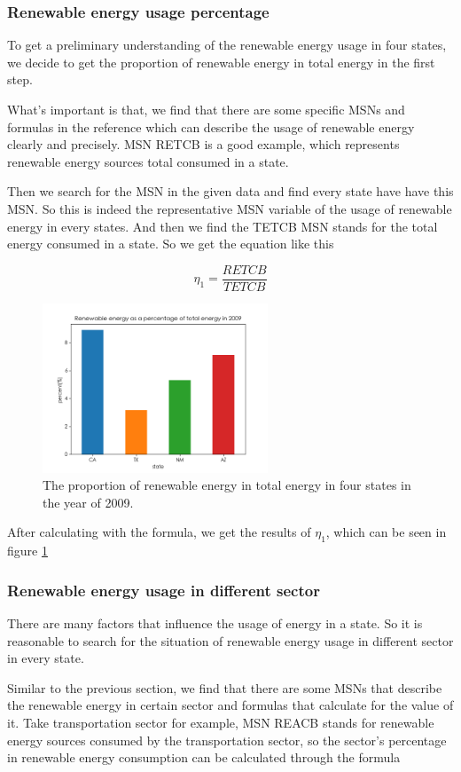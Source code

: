 \documentclass[a4paper,11pt]{article}
\begin{document}
\subsubsection{Renewable energy usage percentage}
\par To get a preliminary understanding of the renewable energy usage in four states, we decide to get the proportion of renewable energy in total energy in the first step.

\par What's important is that, we find that there are some specific MSNs and formulas in the reference \cite{4} which can describe the usage of renewable energy clearly and precisely. MSN RETCB is a good example, which represents renewable energy sources total consumed in a state.
\par Then we search for the MSN in the given data and find every state have have this MSN. So this is indeed the representative MSN variable of the usage of renewable energy in every states. And then we find the TETCB MSN stands for the total energy consumed in a state. So we get the equation like this

\begin{equation}
    \eta_1=\frac{RETCB}{TETCB}
\end{equation}

\begin{figure}[h]%
    \centering 
    \includegraphics[width=0.6\textwidth]{./Pic/1-2.png}
    \caption{The proportion of renewable energy in total energy in four states in the year of 2009.}
    \label{fig:1-2}  
\end{figure}
\par After calculating with the formula, we get the results of $\eta_1$, which can be seen in figure \ref{fig:1-2}

\subsubsection{Renewable energy usage in different sector}
\par There are many factors that influence the usage of energy in a state. So it is reasonable to search for the situation of renewable energy usage in different sector in every state.
\par Similar to the previous section, we find that there are some MSNs that describe the renewable energy in certain sector and formulas that calculate for the value of it. Take transportation sector for example, MSN REACB stands for renewable energy sources consumed by the transportation sector, so the sector's percentage in renewable energy consumption can be calculated through the formula
\end{document}
